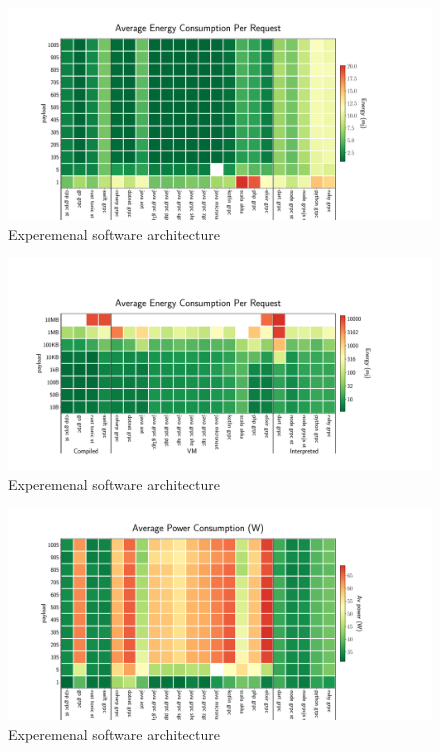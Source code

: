 \begin{figure}[!hbt]
    \begin{center}
        \includegraphics[width=1.2\linewidth]{imgs/rpc_images/energy_cost_clients}
    \end{center}
    \caption{Experemenal software architecture}\label{fig:rpcprotocol}
\end{figure}

\begin{figure}[!hbt]
    \begin{center}
        \includegraphics[width=1.2\linewidth]{imgs/rpc_images/energy_cost_payload}
    \end{center}
    \caption{Experemenal software architecture}\label{fig:energy_cost_payload}
\end{figure}

\begin{figure}[!hbt]
    \begin{center}
        \includegraphics[width=1.2\linewidth]{imgs/rpc_images/power_consumption_clients}
    \end{center}
    \caption{Experemenal software architecture}\label{fig:power_consumption_clients}
\end{figure}


